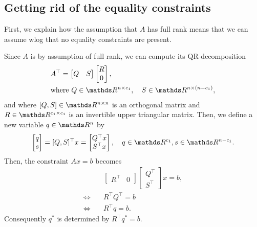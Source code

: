 \documentclass{article}
\numberwithin{equation}{section}
\theoremstyle{nonumberplain}
\begin{document}
\subsection{Getting rid of the equality constraints}

First, we explain how the assumption that $A$ has full rank means that we can assume wlog that no equality constraints are present.

Since $A$ is by assumption of full rank, we can compute its QR-decomposition
\begin{align*}
& A^\top = \begin{bmatrix} Q & S \end{bmatrix} \begin{bmatrix}
R \\ 0
\end{bmatrix},\\
& \text{where } Q \in \R^{n \times c_1}, \quad S \in \R^{n \times (n - c_1)},
\end{align*}
and where $[Q, S]\in \R^{n\times n}$ is an orthogonal matrix and $R \in \R^{c_1 \times c_1}$ is an invertible upper triangular matrix.
Then, we define a new variable $q \in \R^n$ by 
\begin{align*}
\begin{bmatrix}
q \\ s
\end{bmatrix} = [Q, S]^\top x = \begin{bmatrix}
Q^\top x \\ S^\top x
\end{bmatrix}, \quad q \in \R^{c_1}, s \in \R^{n-c_1}.
\end{align*}
Then, the constraint $Ax=b$ becomes
\begin{align*}
& \begin{bmatrix}
R^\top & 0
\end{bmatrix} \begin{bmatrix}
Q^\top \\ S^\top
\end{bmatrix} x = b, \\
\Leftrightarrow \quad & R^\top Q^\top = b \\
\Leftrightarrow \quad & R^\top q = b.
\end{align*}
Consequently $q^*$ is determined by $R^\top q^* = b$.
\end{document}
